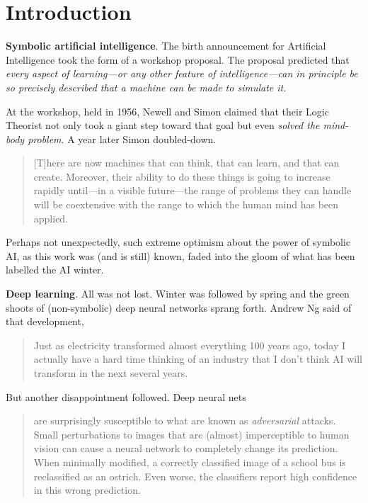 

\section{Introduction}

\noindent\textbf{Symbolic artificial intelligence}. The birth announcement for Artificial Intelligence took the form of a workshop proposal. The proposal predicted that \textit{every aspect of learning---or any other feature of intelligence---can in principle be so precisely described that a machine can be made to simulate it.}\cite{McCarthy_Minsky_Rochester_Shannon_2006, mccarthy2006proposal}  

At the workshop, held in 1956, Newell and Simon claimed that their Logic Theorist not only took a giant step toward that goal but even \textit{solved the mind-body problem}.\cite{russell2010artificial} A year later Simon doubled-down.
\begin{quote}
    [T]here are now machines that can think, that can learn, and that can create. Moreover, their ability to do these things is going to increase rapidly until---in a visible future---the range of problems they can handle will be coextensive with the range to which the human mind has been applied.\cite{simon1957models}
\end{quote}

Perhaps not unexpectedly, such extreme optimism about the power of symbolic AI, as this work was (and is still) known, faded into the gloom of what has been labelled the AI winter. 

\smallv\noindent\textbf{Deep learning}. All was not lost. Winter was followed by spring and the green shoots of (non-symbolic) deep neural networks sprang forth. Andrew Ng said of that development, 
\begin{quote}
Just as electricity transformed almost everything 100 years ago, today I actually have a hard time thinking of an industry that I don’t think AI will transform in the next several years.\cite{ng2018ai}
\end{quote}

But another disappointment followed. Deep neural nets 
\begin{quote}
are surprisingly susceptible to what are known as \textit{adversarial} attacks. Small perturbations to images that are (almost) imperceptible to human vision can cause a neural network to completely change its prediction. When minimally modified, a correctly classified image of a school bus is reclassified as an ostrich. Even worse, the classifiers report high confidence in this wrong prediction.\cite{akhtar2018threat}
\end{quote}

